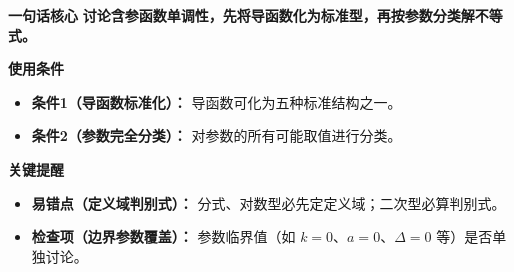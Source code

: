 \begin{summarybox}
	\textbf{\textcolor{CSummary}{一句话核心}}
	\textbf{讨论含参函数单调性，先将导函数化为标准型，再按参数分类解不等式。}

	\medskip
	\textbf{\textcolor{CSummary}{使用条件}}
	\begin{itemize}[itemsep=0.5em, topsep=0.4em]
		\item \textbf{条件1（导函数标准化）：} 导函数可化为五种标准结构之一。
		\item \textbf{条件2（参数完全分类）：} 对参数的所有可能取值进行分类。
	\end{itemize}

	\medskip
	\textbf{\textcolor{CSummary}{关键提醒}}
	\begin{itemize}[itemsep=0.5em, topsep=0.4em]
		\item \textbf{易错点（定义域判别式）：} 分式、对数型必先定定义域；二次型必算判别式。
		\item \textbf{检查项（边界参数覆盖）：} 参数临界值（如 $k=0$、$a=0$、$\Delta=0$ 等）是否单独讨论。
	\end{itemize}

\end{summarybox}
